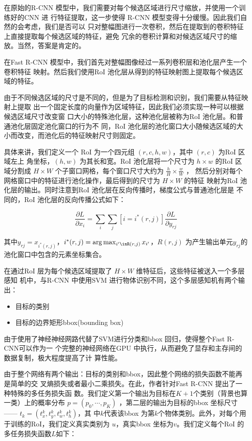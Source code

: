 在原始的R-CNN 模型中，我们需要对每个候选区域进行尺寸缩放，并使用一个训练好的CNN 进
行特征提取，这一步使得 R-CNN 模型变得十分缓慢。因此我们自然的会考虑，我们是否可以
只对整幅图进行一次卷积，然后在提取到的卷积特征上直接提取每个候选区域的特征，避免
冗余的卷积计算和对候选区域尺寸的缩放。当然，答案是肯定的。

在Fast R-CNN 模型中，我们首先对整幅图像经过一系列卷积层和池化层产生一个卷积特征
映射。然后我们使用RoI 池化层从得到的特征映射图上提取每个候选区域的特征。

由于不同候选区域的尺寸是不同的，但是为了目标检测和识别，我们需要从特征映射上提取
出一个固定长度的向量作为区域特征，因此我们必须实现一种可以根据候选区域尺寸改变窗
口大小的特殊池化层，这种池化层被称为RoI 池化层。和普通池化层固定池化窗口的行为不
同，RoI 池化层的池化窗口大小随候选区域的大小而改变，而池化后的特征映射尺寸则固定。


具体来讲，我们定义一个 RoI 为一个四元组 $(r,c,h,w)$，其中 $(r,c)$ 为RoI 区域左上
角坐标，$(h, w)$ 为其长和宽。RoI 池化层将一个尺寸为 $h \times w$ 的RoI 区域分割成
$H \times W$ 个子窗口网格，每个窗口尺寸大约为 $\frac{h}{H} \times \frac{w}{W}$ ，
然后分别对每个网格窗口中的特征进行池化操作，最后得到的尺寸为 $H \times W$ 的特征
映射为RoI 池化层的输出。同时注意到RoI 池化层在反向传播时，梯度公式与普通池化层是
不同的，RoI 池化层的反向传播公式如下：

\[
\frac{\partial L}{\partial x_i} = \sum_{i}\sum_{j}[i = i^*(r,j)]\frac{\partial
  L}{\partial y_{rj}}
\]

其中$y_{rj} = x_{i^*(r,j)}$，$i^*(r,j) = \arg\max_{i'\inR(r,j)}x_{i'}$，$R(r,j)$
为产生输出单元$y_{rj}$的池化窗口中包含的元素坐标集合。

在通过RoI 层为每个候选区域提取了 $H \times W$ 维特征后，这些特征被送入一个多层感知
机中，与R-CNN 中使用SVM 进行物体识别不同，这个多层感知机有两个输出：

\begin{itemize}
  \item 目标的类别
  \item 目标的边界矩形bbox(bounding box)
\end{itemize}

由于使用了神经神经网路代替了SVM进行分类和bbox 回归，使得整个Fast R-CNN可以作为一
个完整的神经网络在GPU 中执行，从而避免了显存和主存间的数据复制，极大程度提高了计
算性能。

由于整个网络有两个输出：目标的类别和bbox，因此整个网络的损失函数不能再是简单的交
叉熵损失或者最小二乘损失。在此，作者针对Fast R-CNN 提出了一种特殊的多任务损失函
数。我们定义第一个输出为目标在$K+1$个类别（背景也算一类）上的概率分布 $p = (p_0,
\cdots, p_K)$ ，第二层的输出为目标的bbox 坐标尺寸 —— $t_k = (t_x^k, t_y^k, t_w^k, t_h^k)$，其
中$k$代表该bbox 为第$k$个物体类别。此外，对每个用于训练的RoI，我们定义真实类别为
$u$，真实bbox 坐标为$v$。我们定义每个RoI 的多任务损失函数$L$如下：

